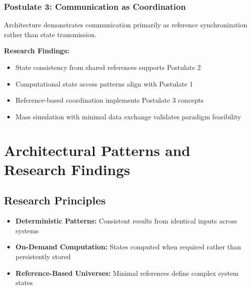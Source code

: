 \documentclass[14pt, a4paper]{extarticle}
\begin{document}
\subsubsection{Postulate 3: Communication as Coordination}
Architecture demonstrates communication primarily as reference synchronization rather than state transmission.

\textbf{Research Findings:}
\begin{itemize}
    \item State consistency from shared references supports Postulate 2
    \item Computational state access patterns align with Postulate 1
    \item Reference-based coordination implements Postulate 3 concepts
    \item Mass simulation with minimal data exchange validates paradigm feasibility
\end{itemize}

\section{Architectural Patterns and Research Findings}

\subsection{Research Principles}
\begin{itemize}
    \item \textbf{Deterministic Patterns:} Consistent results from identical inputs across systems
    \item \textbf{On-Demand Computation:} States computed when required rather than persistently stored
    \item \textbf{Reference-Based Universes:} Minimal references define complex system states
\end{itemize}
\end{document}
